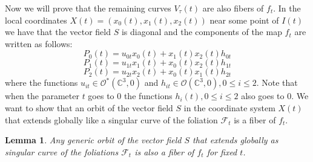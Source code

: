 \documentclass{amsart}
\newtheorem{lemma}[theorem]{Lemma}
\theoremstyle{definition}
\theoremstyle{proposition}
\numberwithin{equation}{section}
\theoremstyle{main}
\begin{document}
Now we will prove that the remaining curves $V_{\tau}(t)$ are also fibers of $f_{t}$. In the local coordinates $X(t)=(x_{0}(t),x_{1}(t),x_{2}(t))$ near some point of $I(t)$ we have that the vector field $S$ is diagonal and the components of the map ${f}_{t}$ are written as follows:
\begin{equation}\label{eq3}
P_{0}(t)=u_{0t}x_{0}(t)+x_{1}(t)x_{2}(t)h_{0t}
\end{equation}
\begin{equation*}
P_{1}(t)=u_{1t}x_{1}(t)+x_{0}(t)x_{2}(t)h_{1t}
\end{equation*}
\begin{equation*}
P_{2}(t)=u_{2t}x_{2}(t)+x_{0}(t)x_{1}(t)h_{2t}
\end{equation*}
where the functions $u_{it} \in \mathcal O^{*}(\mathbb C^3,0)$ and $h_{it} \in \mathcal O(\mathbb C^3,0) ,0\leq i \leq 2$. Note that when the parameter $t$ goes to $0$ the functions $h_{i}(t),0\leq i \leq 2$ also goes to $0$.
We want to show that an orbit of the vector field $S$ in the coordinate system $X(t)$ that extends globally like a singular curve of the foliation $\mathcal F_{t}$ is a fiber of ${f}_{t}$. 

\begin{lemma}\label{casomenor} Any generic orbit of the vector field $S$ that extends globally as singular curve of the foliations $\mathcal F_{t}$ is also a fiber of $f_{t}$ for fixed $t$.
\end{lemma}
\end{document}
